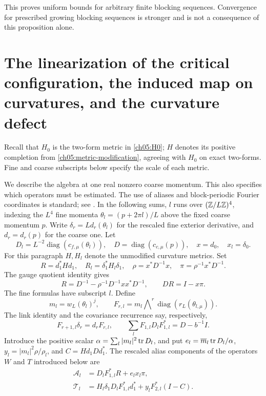This proves uniform bounds for arbitrary finite blocking sequences.
Convergence for prescribed growing blocking sequences is
stronger and is not a consequence of this proposition alone.

\section{The linearization of the critical configuration, the induced map on curvatures, and the curvature defect}
\label{ch05:transports}

Recall that $H_0$ is the two-form metric in \eqref{ch05:H0}; $H$ denotes its positive completion from \eqref{ch05:metric-modification}, agreeing with $H_0$ on exact two-forms. Fine and coarse subscripts below specify the scale of each metric.

We describe the algebra at one real nonzero coarse momentum.
This also specifies which operators must be estimated. The use
of aliases and block-periodic Fourier coordinates is standard;
see \cite{BalabanFeldmanKnoerrerTrubowitzBloch2016}.
In the following sums, $l$ runs over $(\mathbb Z/L\mathbb Z)^4$, indexing the $L^4$ fine momenta
$\theta_l=(p+2\pi l)/L$ above the fixed coarse momentum $p$. Write $\delta_r=Ld_r(\theta_l)$ for the rescaled fine exterior derivative,
and $d_r=d_r(p)$ for the coarse one.
Let
\[
 D_l=L^{-2}\operatorname{diag}(c_{f,\mu}(\theta_l)),
 \quad D=\operatorname{diag}(c_{c,\mu}(p)),\quad
 x=d_0,\quad x_l=\delta_0 .
\]
For this paragraph $H,H_l$ denote the unmodified curvature metrics.
Set
\[
 R=d_1^*Hd_1,\quad R_l=\delta_1^*H_l\delta_1,\quad
 \rho=x^*D^{-1}x,\quad \pi=\rho^{-1}x^*D^{-1}.
\]
The gauge quotient identity gives
\[
 R=D^{-1}-\rho^{-1}D^{-1}xx^*D^{-1},\qquad
 DR=I-x\pi .
\]
The fine formulas have subscript $l$. Define
\[
 m_l=w_L(\theta_l)^j,\qquad
 F_{r,l}=m_l\bigwedge\nolimits^r
            \operatorname{diag}(r_L(\theta_{l,\mu})).
\]
The link identity and the covariance recurrence say, respectively,
\begin{equation}
 F_{r+1,l}\delta_r=d_rF_{r,l},\qquad
             \sum_lF_{1,l}D_lF_{1,l}^*=D-b^{-1}I .
 \label{ch05:transport-input}
\end{equation}
Introduce the positive scalar
$\alpha=\sum_l|m_l|^2\operatorname{tr} D_l$, and put
$e_l=\overline m_l\operatorname{tr} D_l/\alpha$,
$y_l=|m_l|^2\rho/\rho_l$, and $C=Hd_1Dd_1^*$.
The rescaled alias components of the operators $W$ and $T$ introduced below are
\begin{align}
 \mathcal A_l&=D_lF_{1,l}^*R+e_lx_l\pi,\\
 \mathcal T_l&=H_l\delta_1D_lF_{1,l}^*d_1^*
                         +y_lF_{2,l}^*(I-C).
 \label{ch05:transport-formula}
\end{align}
